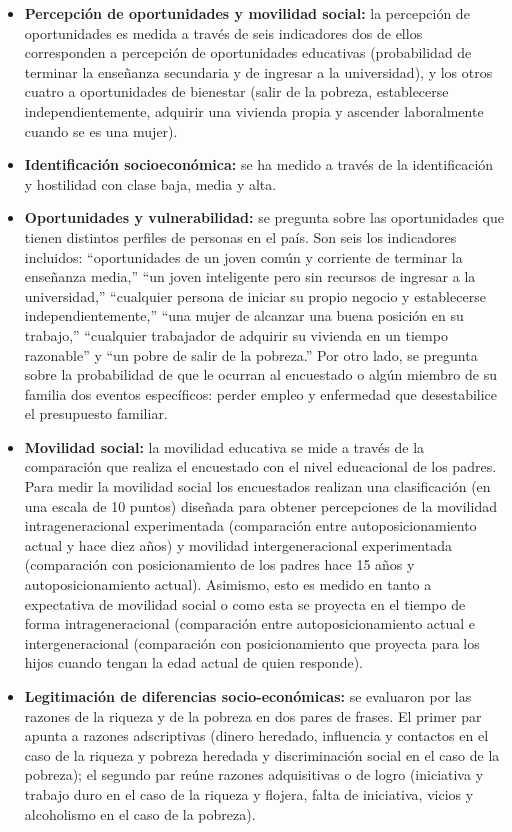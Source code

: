 \documentclass[
  12pt,
]{book}
\begin{document}
\begin{itemize}
\item
  \textbf{Percepción de oportunidades y movilidad social:} la percepción de oportunidades es medida a través de seis indicadores dos de ellos corresponden a percepción de oportunidades educativas (probabilidad de terminar la enseñanza secundaria y de ingresar a la universidad), y los otros cuatro a oportunidades de bienestar (salir de la pobreza, establecerse independientemente, adquirir una vivienda propia y ascender laboralmente cuando se es una mujer).
\item
  \textbf{Identificación socioeconómica:} se ha medido a través de la identificación y hostilidad con clase baja, media y alta.
\item
  \textbf{Oportunidades y vulnerabilidad:} se pregunta sobre las oportunidades que tienen distintos perfiles de personas en el país. Son seis los indicadores incluidos: ``oportunidades de un joven común y corriente de terminar la enseñanza media,'' ``un joven inteligente pero sin recursos de ingresar a la universidad,'' ``cualquier persona de iniciar su propio negocio y establecerse independientemente,'' ``una mujer de alcanzar una buena posición en su trabajo,'' ``cualquier trabajador de adquirir su vivienda en un tiempo razonable'' y ``un pobre de salir de la pobreza.'' Por otro lado, se pregunta sobre la probabilidad de que le ocurran al encuestado o algún miembro de su familia dos eventos específicos: perder empleo y enfermedad que desestabilice el presupuesto familiar.
\item
  \textbf{Movilidad social:} la movilidad educativa se mide a través de la comparación que realiza el encuestado con el nivel educacional de los padres. Para medir la movilidad social los encuestados realizan una clasificación (en una escala de 10 puntos) diseñada para obtener percepciones de la movilidad intrageneracional experimentada (comparación entre autoposicionamiento actual y hace diez años) y movilidad intergeneracional experimentada (comparación con posicionamiento de los padres hace 15 años y autoposicionamiento actual). Asimismo, esto es medido en tanto a expectativa de movilidad social o como esta se proyecta en el tiempo de forma intrageneracional (comparación entre autoposicionamiento actual e intergeneracional (comparación con posicionamiento que proyecta para los hijos cuando tengan la edad actual de quien responde).
\item
  \textbf{Legitimación de diferencias socio-económicas:} se evaluaron por las razones de la riqueza y de la pobreza en dos pares de frases. El primer par apunta a razones adscriptivas (dinero heredado, influencia y contactos en el caso de la riqueza y pobreza heredada y discriminación social en el caso de la pobreza); el segundo par reúne razones adquisitivas o de logro (iniciativa y trabajo duro en el caso de la riqueza y flojera, falta de iniciativa, vicios y alcoholismo en el caso de la pobreza).

\end{itemize}
\end{document}
